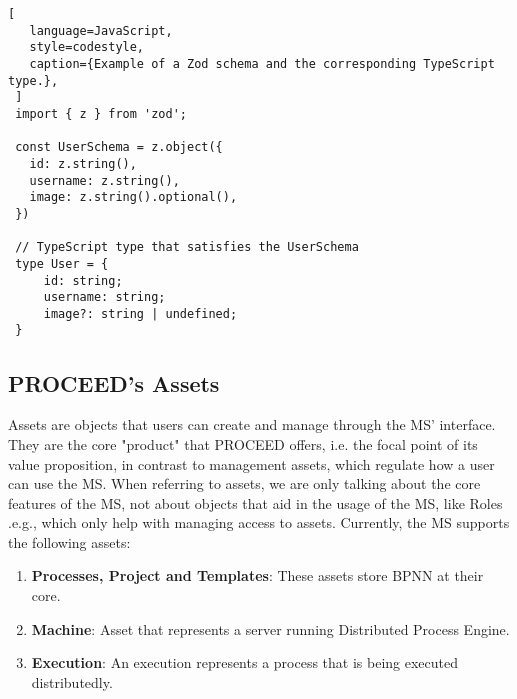  \begin{lstlisting}[
   language=JavaScript,
   style=codestyle,
   caption={Example of a Zod schema and the corresponding TypeScript type.},
 ]
 import { z } from 'zod';

 const UserSchema = z.object({
   id: z.string(),
   username: z.string(),
   image: z.string().optional(),
 })

 // TypeScript type that satisfies the UserSchema
 type User = {
     id: string;
     username: string;
     image?: string | undefined;
 }
 \end{lstlisting}


%

\subsection{PROCEED's Assets}
\label{cha:relatedwork:proceed-assets}

Assets are objects that users can create and manage through the MS' interface.
They are the core "product" that PROCEED offers, i.e. the focal point of its value
proposition,
in contrast to management assets, which regulate how a user can use the MS.
When referring to assets, we are only talking about the core features of the MS,
not about objects that aid in the usage of the MS, like Roles .e.g.,
which only help with managing access to assets.
Currently, the MS supports the following assets:

\begin{enumerate}
  \item \textbf{Processes, Project and Templates}: These assets store BPNN at their core.
  \item \textbf{Machine}: Asset that represents a server running Distributed Process Engine. 
  \item \textbf{Execution}: An execution represents a process that is being executed distributedly.
\end{enumerate}

